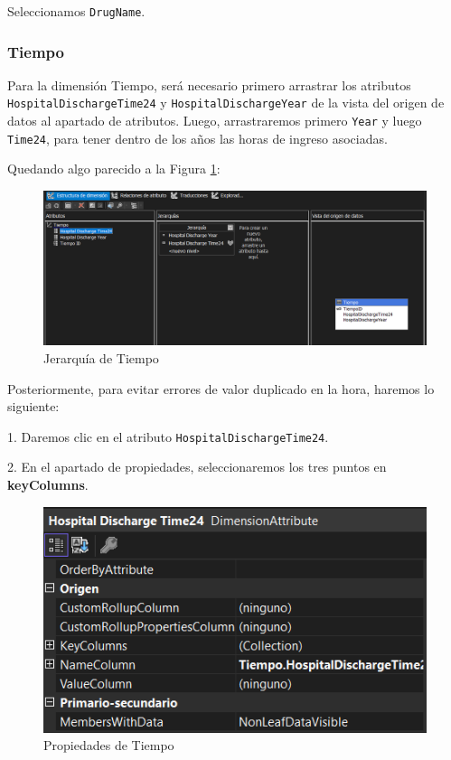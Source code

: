 \documentclass[12pt, a4paper, twoside]{article}
\begin{document}
Seleccionamos \texttt{DrugName}.

\subsubsection{Tiempo}

Para la dimensión Tiempo, será necesario primero arrastrar los atributos \texttt{HospitalDischargeTime24} y \texttt{HospitalDischargeYear} de la vista del origen de datos al apartado de atributos. Luego, arrastraremos primero \texttt{Year} y luego \texttt{Time24}, para tener dentro de los años las horas de ingreso asociadas.

Quedando algo parecido a la Figura \ref{fig:28}:

\begin{figure}[H]
	\centering
	\includegraphics[width=1\textwidth]{image/JTiempo}
	\caption{Jerarquía de Tiempo}
	\label{fig:28}
\end{figure}

Posteriormente, para evitar errores de valor duplicado en la hora, haremos lo siguiente:

1. Daremos clic en el atributo \texttt{HospitalDischargeTime24}.

2. En el apartado de propiedades, seleccionaremos los tres puntos en \textbf{keyColumns}.

\begin{figure}[H]
	\centering
	\includegraphics[width=1\textwidth]{image/tiempoPropiedades}
	\caption{Propiedades de Tiempo}
	\label{fig:25}
\end{figure}
\end{document}
